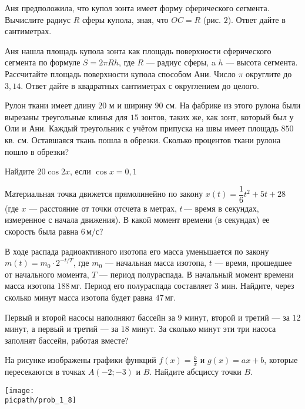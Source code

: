 \begin{training}[2]
\begin{listofex}
		\newpage
		\hphantom{Часть 1}
		\item Аня предположила, что купол зонта имеет форму сферического сегмента. Вычислите радиус \( R \) сферы купола, зная, что \( OC=R \) (рис. \( 2 \)). Ответ дайте в сантиметрах.
		\foranswer
		\item Аня нашла площадь купола зонта как площадь поверхности сферического сегмента по формуле \( S=2\pi Rh \), где \( R \) --- радиус сферы, a \( h \) --- высота сегмента. Рассчитайте площадь поверхности купола способом Ани. Число \( \pi \)  округлите до \( 3,14 \). Ответ дайте в квадратных сантиметрах с округлением до целого.
		\foranswer
		\item Рулон ткани имеет длину \( 20 \) м и ширину \( 90 \) см. На фабрике из этого рулона были вырезаны треугольные клинья для \( 15 \) зонтов, таких же, как зонт, который был у Оли и Ани. Каждый треугольник с учётом припуска на швы имеет площадь \( 850 \) кв. см. Оставшаяся ткань пошла в обрезки. Сколько процентов ткани рулона пошло в обрезки?
		\foranswer
		\item Найдите \( 20\cos2x \), если \( \cos x = 0,1 \)
		\foranswer
		\item 
		Материальная точка движется прямолинейно по закону \( x(t)=\dfrac{1}{6}t^2+5t+28 \) (где \( x \)  --- расстояние от точки отсчета в метрах, \( t \) --- время в секундах, измеренное с начала движения). В какой момент времени (в секундах) ее скорость была равна \( 6 \) м/с?
		\foranswer
		\item В ходе распада радиоактивного изотопа его масса уменьшается по закону \( m(t)=m_0\cdot2^{-t/T} \), где \( m_0 \) --- начальная масса изотопа, \( t \) --- время, прошедшее от начального момента, \( T \) --- период полураспада. В начальный момент времени масса изотопа \( 188 \) мг. Период его полураспада составляет \( 3 \) мин. Найдите, через сколько минут масса изотопа будет равна \( 47 \) мг.
		\foranswer
		\newpage
		\hphantom{Часть 1}
		\item Первый и второй насосы наполняют бассейн за \( 9 \) минут,
		второй и третий --- за \( 12 \) минут, а первый и третий --- за \( 18 \) минут.
		За сколько минут эти три насоса заполнят бассейн, работая вместе?
		\foranswer
		\item 
		На рисунке изображены графики функций \( f(x) = \frac{k}{x} \) и \( g(x) = ax+b \),
		которые пересекаются в точках \( A(-2;-3) \) и \( B \). Найдите абсциссу точки \( B \).
		\begin{center}
			\texttt{[image: \\picpath/prob\_1\_8]}

\end{center}
\end{listofex}
\end{training}
